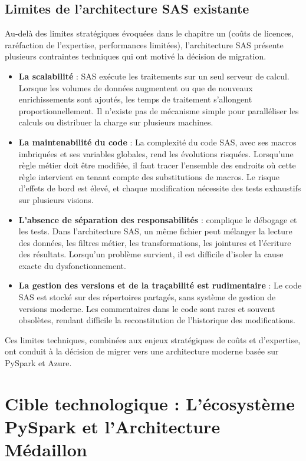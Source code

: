 \subsection{Limites de l'architecture SAS existante}

Au-delà des limites stratégiques évoquées dans le chapitre un (coûts de licences, raréfaction de l'expertise, performances limitées), l'architecture SAS présente plusieurs contraintes techniques qui ont motivé la décision de migration.

\begin{itemize}
    \item \textbf{La scalabilité} : SAS exécute les traitements sur un seul serveur de calcul. Lorsque les volumes de données augmentent ou que de nouveaux enrichissements sont ajoutés, les temps de traitement s'allongent proportionnellement. Il n'existe pas de mécanisme simple pour paralléliser les calculs ou distribuer la charge sur plusieurs machines.
    \item \textbf{La maintenabilité du code} : La complexité du code SAS, avec ses macros imbriquées et ses variables globales, rend les évolutions risquées. Lorsqu'une règle métier doit être modifiée, il faut tracer l'ensemble des endroits où cette règle intervient en tenant compte des substitutions de macros. Le risque d'effets de bord est élevé, et chaque modification nécessite des tests exhaustifs sur plusieurs visions.
    \item \textbf{L'absence de séparation des responsabilités} : complique le débogage et les tests. Dans l'architecture SAS, un même fichier peut mélanger la lecture des données, les filtres métier, les transformations, les jointures et l'écriture des résultats. Lorsqu'un problème survient, il est difficile d'isoler la cause exacte du dysfonctionnement.
    \item \textbf{La gestion des versions et de la traçabilité est rudimentaire} : Le code SAS est stocké sur des répertoires partagés, sans système de gestion de versions moderne. Les commentaires dans le code sont rares et souvent obsolètes, rendant difficile la reconstitution de l'historique des modifications.
\end{itemize}

Ces limites techniques, combinées aux enjeux stratégiques de coûts et d'expertise, ont conduit à la décision de migrer vers une architecture moderne basée sur PySpark et Azure.

\section{Cible technologique : L'écosystème PySpark et l'Architecture Médaillon}

